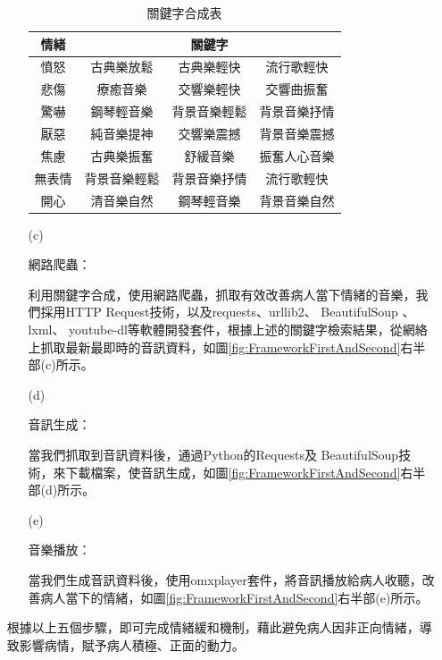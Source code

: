 \documentclass[12pt]{scrreprt}
\begin{document}
\begin{itemize}
\begin{itemize}
\renewcommand{\arraystretch}{1.0} 
\renewcommand{\multirowsetup}{\centering}
\begin{table}[h]
\caption{關鍵字合成表}
    \centering
\begin{tabular}{|*{4}{r|}}
\hline
\multicolumn{1}{|c|}{情緒}
& \multicolumn{3}{c|}{關鍵字} \\\hline
\multicolumn{1}{|c}{憤怒}&\multicolumn{1}{|c}{古典樂放鬆}&\multicolumn{1}{|c}{古典樂輕快}&\multicolumn{1}{|c|}{流行歌輕快} \\\hline
\multicolumn{1}{|c}{悲傷}&\multicolumn{1}{|c}{療癒音樂}&\multicolumn{1}{|c}{交響樂輕快}&\multicolumn{1}{|c|}{交響曲振奮} \\\hline
\multicolumn{1}{|c}{驚嚇}&\multicolumn{1}{|c}{鋼琴輕音樂}&\multicolumn{1}{|c}{背景音樂輕鬆}&\multicolumn{1}{|c|}{背景音樂抒情}\\\hline
\multicolumn{1}{|c}{厭惡}&\multicolumn{1}{|c}{純音樂提神}&\multicolumn{1}{|c}{交響樂震撼}&\multicolumn{1}{|c|}{背景音樂震撼}\\\hline
\multicolumn{1}{|c}{焦慮}&\multicolumn{1}{|c}{古典樂振奮}   &\multicolumn{1}{|c}{舒緩音樂}   &\multicolumn{1}{|c|}{振奮人心音樂}\\\hline
\multicolumn{1}{|c}{無表情}&\multicolumn{1}{|c}{背景音樂輕鬆}   &\multicolumn{1}{|c}{背景音樂抒情}   &\multicolumn{1}{|c|}{流行歌輕快}\\\hline
\multicolumn{1}{|c}{開心}&\multicolumn{1}{|c}{清音樂自然}   &\multicolumn{1}{|c}{鋼琴輕音樂}   &\multicolumn{1}{|c|}{背景音樂自然}\\\hline
\end{tabular}
\label{lab:2}
\end{table}

\item[(c)]{\begin{bfseries}{網路爬蟲：}\end{bfseries}}

利用關鍵字合成，使用網路爬蟲，抓取有效改善病人當下情緒的音樂，我們採用HTTP Request技術，以及requests、urllib2、 BeautifulSoup 、lxml、 youtube-dl等軟體開發套件，根據上述的關鍵字檢索結果，從網絡上抓取最新最即時的音訊資料，如圖\ref{fig:FrameworkFirstAndSecond}右半部(c)所示。

\item[(d)]{\begin{bfseries}{音訊生成：}\end{bfseries}}

當我們抓取到音訊資料後，通過Python的Requests及 BeautifulSoup技術，來下載檔案，使音訊生成，如圖\ref{fig:FrameworkFirstAndSecond}右半部(d)所示。

\item[(e)]{\begin{bfseries}{音樂播放：}\end{bfseries}}

當我們生成音訊資料後，使用omxplayer套件，將音訊播放給病人收聽，改善病人當下的情緒，如圖\ref{fig:FrameworkFirstAndSecond}右半部(e)所示。

\end{itemize}

根據以上五個步驟，即可完成情緒緩和機制，藉此避免病人因非正向情緒，導致影響病情，賦予病人積極、正面的動力。
\end{itemize}
\end{document}
